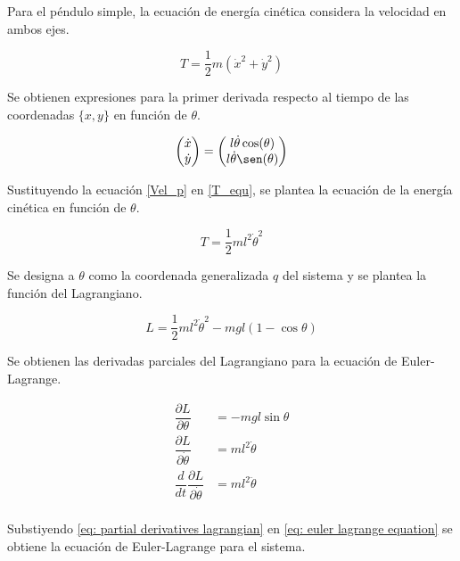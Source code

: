 Para el péndulo simple, la ecuación de energía cinética considera
la velocidad en ambos ejes.

\begin{equation} 
T = \frac{1}{2}m(\dot{x}^2 + \dot{y}^2) 
\label{T_equ}
\end{equation}

Se obtienen expresiones para la primer derivada respecto al tiempo de 
las coordenadas $\{x, y\}$ en función de $\theta$.

\begin{equation} 
\begin{pmatrix}
\dot{x}\\
\dot{y}
\end{pmatrix}
= 
\begin{pmatrix}
l\dot{\theta}\cos(\theta)\\
l\dot{\theta}\sen(\theta)
\end{pmatrix}
\label{Vel_p}
\end{equation}


Sustituyendo la ecuación \ref{Vel_p} en \ref{T_equ}, 
se plantea la ecuación de la energía cinética en función de $\theta$.

\begin{equation}
T = \frac{1}{2}ml^2\dot{\theta}^2
\end{equation}


Se designa a $\theta$ como la coordenada generalizada $q$ del sistema y
se plantea la función del Lagrangiano.


\begin{equation}
   L = \dfrac{1}{2}m l^2 \dot{\theta}^2 - m g l (1 - \cos{\theta})
 \label{eq: pendulum lagrangian}
\end{equation}

Se obtienen las derivadas parciales del Lagrangiano para la ecuación de 
Euler-Lagrange.

\begin{equation}
\begin{split}
  \dfrac{\partial L}{\partial \theta} &= - m g l \sin{\theta} \\
  \dfrac{\partial L}{\partial \dot{\theta}} &= m l ^2 \dot{\theta}\\
  \dfrac{d}{dt}\dfrac{\partial L}{\partial \dot{\theta}} &= ml^2\ddot{\theta}\\
  \end{split}
 \label{eq: partial derivatives lagrangian}
\end{equation}


Substiyendo \eqref{eq: partial derivatives lagrangian} 
en \eqref{eq: euler lagrange equation}
se obtiene la ecuación de Euler-Lagrange para el sistema.

